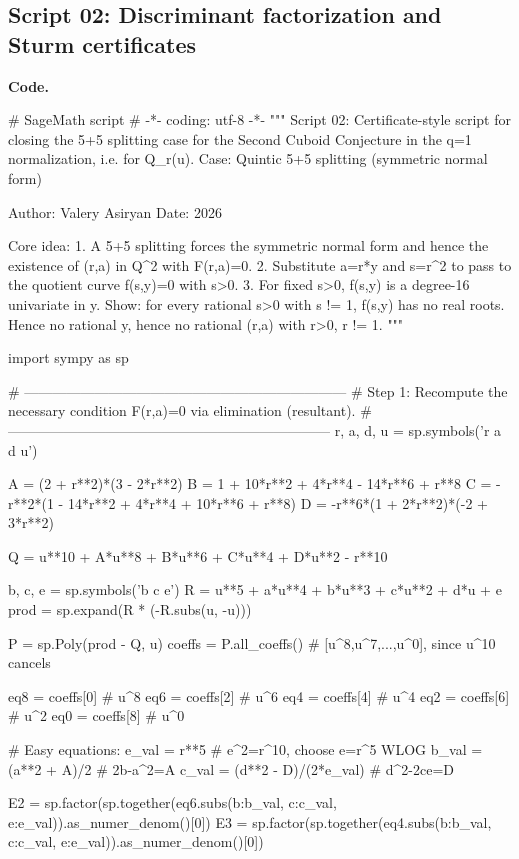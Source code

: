 \documentclass[12pt]{article}
\theoremstyle{remark}
\theoremstyle{definition}
\begin{document}
\subsection*{Script 02: Discriminant factorization and Sturm certificates}
\noindent\textbf{Code.}
\begin{code}
# SageMath script
# -*- coding: utf-8 -*-
"""
Script 02: Certificate-style script for closing the 5+5 splitting case for the Second Cuboid Conjecture in the q=1 normalization, i.e. for Q_r(u).
Case: Quintic 5+5 splitting (symmetric normal form)

Author: Valery Asiryan
Date: 2026

Core idea:
1.  A 5+5 splitting forces the symmetric normal form and hence the existence of (r,a) in Q^2 with F(r,a)=0.
2.  Substitute a=r*y and s=r^2 to pass to the quotient curve f(s,y)=0 with s>0.
3.  For fixed s>0, f(s,y) is a degree-16 univariate in y.
    Show: for every rational s>0 with s != 1, f(s,y) has no real roots.
    Hence no rational y, hence no rational (r,a) with r>0, r != 1.
"""

import sympy as sp

# ---------------------------------------------------------------------
# Step 1: Recompute the necessary condition F(r,a)=0 via elimination (resultant).
# ---------------------------------------------------------------------
r, a, d, u = sp.symbols('r a d u')

A = (2 + r**2)*(3 - 2*r**2)
B = 1 + 10*r**2 + 4*r**4 - 14*r**6 + r**8
C = -r**2*(1 - 14*r**2 + 4*r**4 + 10*r**6 + r**8)
D = -r**6*(1 + 2*r**2)*(-2 + 3*r**2)

Q = u**10 + A*u**8 + B*u**6 + C*u**4 + D*u**2 - r**10

b, c, e = sp.symbols('b c e')
R = u**5 + a*u**4 + b*u**3 + c*u**2 + d*u + e
prod = sp.expand(R * (-R.subs(u, -u)))

P = sp.Poly(prod - Q, u)
coeffs = P.all_coeffs()  # [u^8,u^7,...,u^0], since u^10 cancels

eq8 = coeffs[0]   # u^8
eq6 = coeffs[2]   # u^6
eq4 = coeffs[4]   # u^4
eq2 = coeffs[6]   # u^2
eq0 = coeffs[8]   # u^0

# Easy equations:
e_val = r**5                 # e^2=r^10, choose e=r^5 WLOG
b_val = (a**2 + A)/2         # 2b-a^2=A
c_val = (d**2 - D)/(2*e_val) # d^2-2ce=D

E2 = sp.factor(sp.together(eq6.subs({b:b_val, c:c_val, e:e_val})).as_numer_denom()[0])
E3 = sp.factor(sp.together(eq4.subs({b:b_val, c:c_val, e:e_val})).as_numer_denom()[0])


\end{code}
\end{document}
